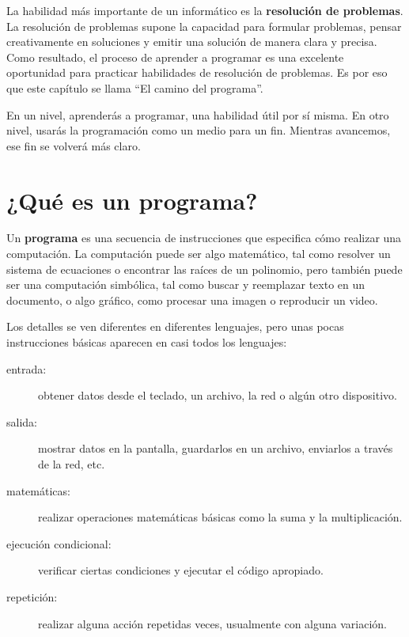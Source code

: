 \documentclass[10pt]{book}
\begin{document}
La habilidad más importante de un informático es la {\bf resolución
 de problemas}.  La resolución de problemas supone la capacidad para
 formular problemas, pensar creativamente en soluciones y emitir una solución
de manera clara y precisa.  Como resultado, el proceso de aprender a
programar es una excelente oportunidad para practicar habilidades de
resolución de problemas.  Es por eso que este capítulo se llama ``El camino del
programa''.

En un nivel, aprenderás a programar, una habilidad útil por
sí misma.  En otro nivel, usarás la programación como un medio para un
fin.  Mientras avancemos, ese fin se volverá más claro.


\section{¿Qué es un programa?}

Un {\bf programa} es una secuencia de instrucciones que especifica cómo
realizar una computación.  La computación puede ser algo matemático,
tal como resolver un sistema de ecuaciones o encontrar las raíces de un
polinomio, pero también puede ser una computación simbólica, tal como
buscar y reemplazar texto en un documento, o algo gráfico, como procesar
una imagen o reproducir un video.

Los detalles se ven diferentes en diferentes lenguajes, pero unas pocas
instrucciones básicas aparecen en casi todos los lenguajes:

\begin{description}

\item[entrada:] obtener datos desde el teclado, un archivo, la red o algún
otro dispositivo.

\item[salida:] mostrar datos en la pantalla, guardarlos en un
archivo, enviarlos a través de la red, etc.

\item[matemáticas:] realizar operaciones matemáticas básicas como la suma y
la multiplicación.

\item[ejecución condicional:] verificar ciertas condiciones y
ejecutar el código apropiado.

\item[repetición:] realizar alguna acción repetidas veces, usualmente con
alguna variación.

\end{description}
\end{document}
